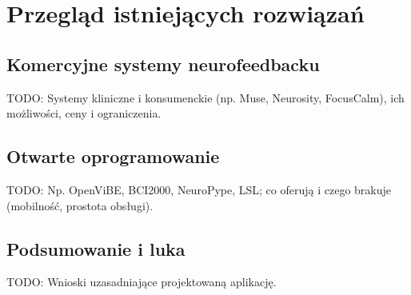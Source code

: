 \chapter{Przegląd istniejących rozwiązań}
\label{chapt:Przeglad}

\section{Komercyjne systemy neurofeedbacku}
TODO: Systemy kliniczne i konsumenckie (np. Muse, Neurosity, FocusCalm), ich możliwości, ceny i ograniczenia.

\section{Otwarte oprogramowanie}
TODO: Np. OpenViBE, BCI2000, NeuroPype, LSL; co oferują i czego brakuje (mobilność, prostota obsługi).

\section{Podsumowanie i luka}
TODO: Wnioski uzasadniające projektowaną aplikację.
